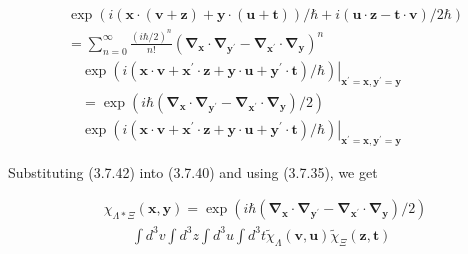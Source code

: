 \documentclass{article}
\begin{document}
\begin{align*}
& \exp (i(\boldsymbol{x} \cdot(\boldsymbol{v}+\boldsymbol{z})+\boldsymbol{y} \cdot(\boldsymbol{u}+\boldsymbol{t})) / \hbar+i(\boldsymbol{u} \cdot \boldsymbol{z}-\boldsymbol{t} \cdot \boldsymbol{v}) / 2 \hbar)  \tag{3.7.42}\\
& =\sum_{n=0}^{\infty} \frac{(i \hbar / 2)^{n}}{n!}\left(\boldsymbol{\nabla}_{\boldsymbol{x}} \cdot \boldsymbol{\nabla}_{\boldsymbol{y}^{\prime}}-\boldsymbol{\nabla}_{\boldsymbol{x}^{\prime}} \cdot \boldsymbol{\nabla}_{\boldsymbol{y}}\right)^{n} \\
& \left.\quad \exp \left(i\left(\boldsymbol{x} \cdot \boldsymbol{v}+\boldsymbol{x}^{\prime} \cdot \boldsymbol{z}+\boldsymbol{y} \cdot \boldsymbol{u}+\boldsymbol{y}^{\prime} \cdot \boldsymbol{t}\right) / \hbar\right)\right|_{\boldsymbol{x}^{\prime}=\boldsymbol{x}, \boldsymbol{y}^{\prime}=\boldsymbol{y}} \\
& \quad=\exp \left(i \hbar\left(\boldsymbol{\nabla}_{\boldsymbol{x}} \cdot \boldsymbol{\nabla}_{\boldsymbol{y}^{\prime}}-\boldsymbol{\nabla}_{\boldsymbol{x}^{\prime}} \cdot \boldsymbol{\nabla}_{\boldsymbol{y}}\right) / 2\right) \\
& \left.\quad \exp \left(i\left(\boldsymbol{x} \cdot \boldsymbol{v}+\boldsymbol{x}^{\prime} \cdot \boldsymbol{z}+\boldsymbol{y} \cdot \boldsymbol{u}+\boldsymbol{y}^{\prime} \cdot \boldsymbol{t}\right) / \hbar\right)\right|_{\boldsymbol{x}^{\prime}=\boldsymbol{x}, \boldsymbol{y}^{\prime}=\boldsymbol{y}}
\end{align*}
 

Substituting (3.7.42) into (3.7.40) and using (3.7.35), we get
 
\begin{align*}
& \chi_{\Lambda * \Xi}(\boldsymbol{x}, \boldsymbol{y})=\exp \left(i \hbar\left(\boldsymbol{\nabla}_{\boldsymbol{x}} \cdot \boldsymbol{\nabla}_{\boldsymbol{y}^{\prime}}-\boldsymbol{\nabla}_{\boldsymbol{x}^{\prime}} \cdot \boldsymbol{\nabla}_{\boldsymbol{y}}\right) / 2\right)  \tag{3.7.43}\\
& \qquad \int d^{3} v \int d^{3} z \int d^{3} u \int d^{3} t \tilde{\chi}_{\Lambda}(\boldsymbol{v}, \boldsymbol{u}) \tilde{\chi}_{\Xi}(\boldsymbol{z}, \boldsymbol{t})
\end{align*}
 
\end{document}
